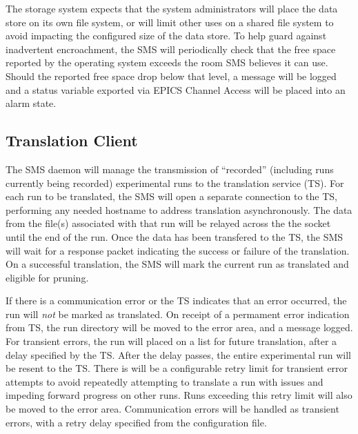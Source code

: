 The storage system expects that the system administrators will place the
data store on its own file system, or will limit other uses on a shared
file system to avoid impacting the configured size of the data store. To
help guard against inadvertent encroachment, the SMS will periodically check
that the free space reported by the operating system exceeds the room
SMS believes it can use. Should the reported free space drop below that level,
a message will be logged and a status variable exported via EPICS Channel
Access will be placed into an alarm state.




\subsection{Translation Client}

The SMS daemon will manage the transmission of ``recorded'' (including runs
currently being recorded) experimental runs to the translation service (TS).
For each run to be translated, the SMS will open a separate connection to the
TS, performing any needed hostname to address translation asynchronously. The
data from the file(s) associated with that run will be relayed across the the
socket until the end of the run. Once the data has been transfered to the TS,
the SMS will wait for a response packet indicating the success or failure of
the translation.  On a successful translation, the SMS will mark the current
run as translated and eligible for pruning.

If there is a communication error or the TS indicates that an error occurred,
the run will \emph{not} be marked as translated. On receipt of a permament
error indication from TS, the run directory will be moved to the error area,
and a message logged. For transient errors, the run will placed on a list for
future translation, after a delay specified by the TS. After the delay passes,
the entire experimental run will be resent to the TS. There is will be a
configurable retry limit for transient error attempts to avoid repeatedly
attempting to translate a run with issues and impeding forward progress on
other runs.  Runs exceeding this retry limit will also be moved to the error
area. Communication errors will be handled as transient errors, with a retry
delay specified from the configuration file.

